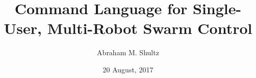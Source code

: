 \documentclass[12pt,english]{report}
\title{Command Language for Single-User, Multi-Robot Swarm Control}
\author{Abraham M. Shultz}
\date{ 20 August, 2017}
\begin{document}
\clearpage
















%

\begin{appendices}


\end{appendices}
\end{document}
